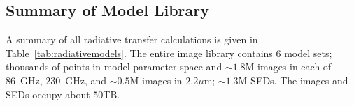 \subsection{Summary of \sgra Model Library}


A summary of all radiative transfer calculations is given in Table~\ref{tab:radiativemodels}. The entire image library
contains $6$ model sets; thousands of points in model parameter space and
$\sim 1.8$M images in each of 86~GHz, 230~GHz, and $\sim0.5$M images in $2.2\mu$m;
$\sim1.3$M SEDs.  The images and SEDs occupy about $50$TB.

